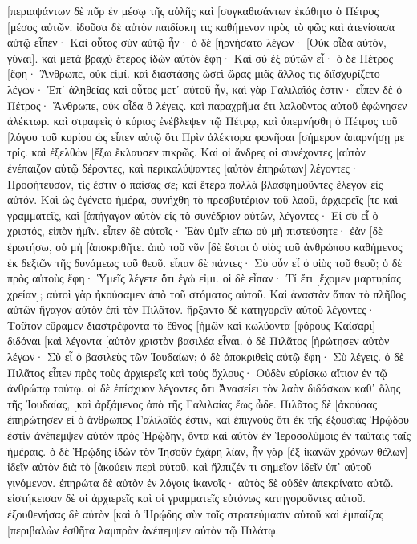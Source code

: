 [περιαψάντων δὲ πῦρ ἐν μέσῳ τῆς αὐλῆς καὶ [συγκαθισάντων ἐκάθητο ὁ Πέτρος [μέσος αὐτῶν. 
ἰδοῦσα δὲ αὐτὸν παιδίσκη τις καθήμενον πρὸς τὸ φῶς καὶ ἀτενίσασα αὐτῷ εἶπεν· Καὶ οὗτος σὺν αὐτῷ ἦν· 
ὁ δὲ [ἠρνήσατο λέγων· [Οὐκ οἶδα αὐτόν, γύναι]. 
καὶ μετὰ βραχὺ ἕτερος ἰδὼν αὐτὸν ἔφη· Καὶ σὺ ἐξ αὐτῶν εἶ· ὁ δὲ Πέτρος [ἔφη· Ἄνθρωπε, οὐκ εἰμί. 
καὶ διαστάσης ὡσεὶ ὥρας μιᾶς ἄλλος τις διϊσχυρίζετο λέγων· Ἐπ᾽ ἀληθείας καὶ οὗτος μετ᾽ αὐτοῦ ἦν, καὶ γὰρ Γαλιλαῖός ἐστιν· 
εἶπεν δὲ ὁ Πέτρος· Ἄνθρωπε, οὐκ οἶδα ὃ λέγεις. καὶ παραχρῆμα ἔτι λαλοῦντος αὐτοῦ ἐφώνησεν ἀλέκτωρ. 
καὶ στραφεὶς ὁ κύριος ἐνέβλεψεν τῷ Πέτρῳ, καὶ ὑπεμνήσθη ὁ Πέτρος τοῦ [λόγου τοῦ κυρίου ὡς εἶπεν αὐτῷ ὅτι Πρὶν ἀλέκτορα φωνῆσαι [σήμερον ἀπαρνήσῃ με τρίς. 
καὶ ἐξελθὼν [ἔξω ἔκλαυσεν πικρῶς. 
Καὶ οἱ ἄνδρες οἱ συνέχοντες [αὐτὸν ἐνέπαιζον αὐτῷ δέροντες, 
καὶ περικαλύψαντες [αὐτὸν ἐπηρώτων] λέγοντες· Προφήτευσον, τίς ἐστιν ὁ παίσας σε; 
καὶ ἕτερα πολλὰ βλασφημοῦντες ἔλεγον εἰς αὐτόν. 
Καὶ ὡς ἐγένετο ἡμέρα, συνήχθη τὸ πρεσβυτέριον τοῦ λαοῦ, ἀρχιερεῖς [τε καὶ γραμματεῖς, καὶ [ἀπήγαγον αὐτὸν εἰς τὸ συνέδριον αὐτῶν, 
λέγοντες· Εἰ σὺ εἶ ὁ χριστός, εἰπὸν ἡμῖν. εἶπεν δὲ αὐτοῖς· Ἐὰν ὑμῖν εἴπω οὐ μὴ πιστεύσητε· 
ἐὰν [δὲ ἐρωτήσω, οὐ μὴ [ἀποκριθῆτε. 
ἀπὸ τοῦ νῦν [δὲ ἔσται ὁ υἱὸς τοῦ ἀνθρώπου καθήμενος ἐκ δεξιῶν τῆς δυνάμεως τοῦ θεοῦ. 
εἶπαν δὲ πάντες· Σὺ οὖν εἶ ὁ υἱὸς τοῦ θεοῦ; ὁ δὲ πρὸς αὐτοὺς ἔφη· Ὑμεῖς λέγετε ὅτι ἐγώ εἰμι. 
οἱ δὲ εἶπαν· Τί ἔτι [ἔχομεν μαρτυρίας χρείαν]; αὐτοὶ γὰρ ἠκούσαμεν ἀπὸ τοῦ στόματος αὐτοῦ. 
Καὶ ἀναστὰν ἅπαν τὸ πλῆθος αὐτῶν ἤγαγον αὐτὸν ἐπὶ τὸν Πιλᾶτον. 
ἤρξαντο δὲ κατηγορεῖν αὐτοῦ λέγοντες· Τοῦτον εὕραμεν διαστρέφοντα τὸ ἔθνος [ἡμῶν καὶ κωλύοντα [φόρους Καίσαρι] διδόναι [καὶ λέγοντα [αὑτὸν χριστὸν βασιλέα εἶναι. 
ὁ δὲ Πιλᾶτος [ἠρώτησεν αὐτὸν λέγων· Σὺ εἶ ὁ βασιλεὺς τῶν Ἰουδαίων; ὁ δὲ ἀποκριθεὶς αὐτῷ ἔφη· Σὺ λέγεις. 
ὁ δὲ Πιλᾶτος εἶπεν πρὸς τοὺς ἀρχιερεῖς καὶ τοὺς ὄχλους· Οὐδὲν εὑρίσκω αἴτιον ἐν τῷ ἀνθρώπῳ τούτῳ. 
οἱ δὲ ἐπίσχυον λέγοντες ὅτι Ἀνασείει τὸν λαὸν διδάσκων καθ᾽ ὅλης τῆς Ἰουδαίας, [καὶ ἀρξάμενος ἀπὸ τῆς Γαλιλαίας ἕως ὧδε. 
Πιλᾶτος δὲ [ἀκούσας ἐπηρώτησεν εἰ ὁ ἄνθρωπος Γαλιλαῖός ἐστιν, 
καὶ ἐπιγνοὺς ὅτι ἐκ τῆς ἐξουσίας Ἡρῴδου ἐστὶν ἀνέπεμψεν αὐτὸν πρὸς Ἡρῴδην, ὄντα καὶ αὐτὸν ἐν Ἱεροσολύμοις ἐν ταύταις ταῖς ἡμέραις. 
ὁ δὲ Ἡρῴδης ἰδὼν τὸν Ἰησοῦν ἐχάρη λίαν, ἦν γὰρ [ἐξ ἱκανῶν χρόνων θέλων] ἰδεῖν αὐτὸν διὰ τὸ [ἀκούειν περὶ αὐτοῦ, καὶ ἤλπιζέν τι σημεῖον ἰδεῖν ὑπ᾽ αὐτοῦ γινόμενον. 
ἐπηρώτα δὲ αὐτὸν ἐν λόγοις ἱκανοῖς· αὐτὸς δὲ οὐδὲν ἀπεκρίνατο αὐτῷ. 
εἱστήκεισαν δὲ οἱ ἀρχιερεῖς καὶ οἱ γραμματεῖς εὐτόνως κατηγοροῦντες αὐτοῦ. 
ἐξουθενήσας δὲ αὐτὸν [καὶ ὁ Ἡρῴδης σὺν τοῖς στρατεύμασιν αὐτοῦ καὶ ἐμπαίξας [περιβαλὼν ἐσθῆτα λαμπρὰν ἀνέπεμψεν αὐτὸν τῷ Πιλάτῳ. 
